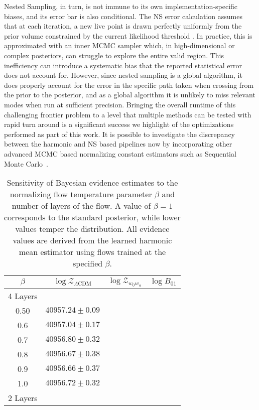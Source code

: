 \documentclass[twocolumn]{openjournal}
\begin{document}
Nested Sampling, in turn, is not immune to its own implementation-specific biases, and its error bar is also conditional. The NS error calculation assumes that at each iteration, a new live point is drawn perfectly uniformly from the prior volume constrained by the current likelihood threshold \citep{Skilling06}. In practice, this is approximated with an inner MCMC sampler which, in high-dimensional or complex posteriors, can struggle to explore the entire valid region. This inefficiency can introduce a systematic bias that the reported statistical error does not account for. However, since nested sampling is a global algorithm, it does properly account for the error in the specific path taken when crossing from the prior to the posterior, and as a global algorithm it is unlikely to miss relevant modes when run at sufficient precision. Bringing the overall runtime of this challenging frontier problem to a level that multiple methods can be tested with rapid turn around is a significant success we highlight of the optimizations performed as part of this work. It is possible to investigate the discrepancy between the harmonic and NS based pipelines now by incorporating other advanced MCMC based normalizing constant estimators such as Sequential Monte Carlo~\citep{doucet_introduction_2001}. 

\begin{table}[t!]
\centering
\caption{Sensitivity of Bayesian evidence estimates to the normalizing flow temperature parameter $\beta$ and number of layers of the flow. A value of $\beta=1$ corresponds to the standard posterior, while lower values temper the distribution. All evidence values are derived from the learned harmonic mean estimator using flows trained at the specified $\beta$.}
\label{tab:flow_sensitivity}
\begin{tabular}{c c c c}
\toprule
\textbf{$\beta$} & \textbf{$\log \mathcal{Z}_{\Lambda\text{CDM}}$} & \textbf{$\log \mathcal{Z}_{w_0w_a}$} & \textbf{$\log B_{01}$} \\
\midrule
4 Layers \\
\midrule
0.50 & $40957.24 \pm 0.09$ &  & \\
0.6 & $40957.04 \pm 0.17$ &  & \\
0.7 & $40956.80 \pm 0.32$ & &  \\
0.8 & $40956.67 \pm 0.38$&& \\
0.9 & $40956.66 \pm 0.37$&& \\
1.0 & $40956.72 \pm 0.32$&&\\
\midrule 
2 Layers \\
\midrule
\bottomrule
\end{tabular}
\end{table}
\end{document}
